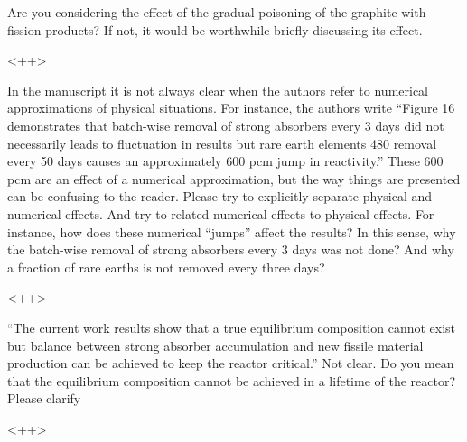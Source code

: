 \documentclass[answers,11pt]{exam}
\begin{document}
\begin{questions}

        \question Are you considering the effect of the gradual poisoning of 
        the graphite with fission products? If not, it would be worthwhile 
        briefly discussing its effect.
        \begin{solution}
                <++>
        \end{solution}


        \question In the manuscript it is not always clear when the authors 
        refer to numerical approximations of physical situations. For instance, 
        the authors write ``Figure 16 demonstrates that batch-wise removal of 
        strong absorbers every 3 days did not necessarily leads to fluctuation 
        in results but rare earth elements 480 removal every 50 days causes an 
        approximately 600 pcm jump in reactivity.'' These 600 pcm are an effect 
        of a numerical approximation, but the way things are presented can be 
        confusing to the reader. Please try to explicitly separate physical and 
        numerical effects. And try to related numerical effects to physical 
        effects. For instance, how does these numerical ``jumps'' affect the 
        results?  In this sense, why the batch-wise removal of strong absorbers 
        every 3 days  was not done? And why a fraction of rare earths  is not 
        removed every three days?
        \begin{solution}
                <++>
        \end{solution}




        \question ``The current work results show that a true equilibrium 
        composition cannot exist but balance between strong absorber 
        accumulation and new fissile material production can be achieved to 
        keep the reactor critical.'' Not clear. Do you mean that the equilibrium 
        composition cannot be achieved in a lifetime of the reactor? Please 
        clarify
        \begin{solution}
                <++>
        \end{solution}








\end{questions}
\end{document}
